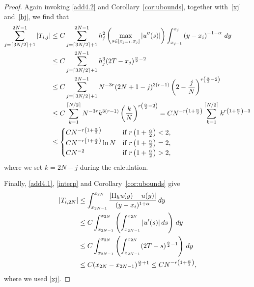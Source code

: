 \documentclass[smallextended]{svjour3}       %
\begin{document}
\begin{proof}
	Again  invoking \eqref{add4.2} and Corollary~\ref{cor:ubounds}, together with~\eqref{xj} and~\eqref{hj}, we find that
	\begin{align}
		\sum_{j=\lceil 3N/2\rceil +1}^{2N-1}  |T_{i,j}| &\le C \sum_{j=\lceil 3N/2\rceil +1}^{2N-1}   h_j^2
		\left(\max_{s\in[x_{j-1}, x_j]} \left| u''(s)\right| \right)
		\int_{x_{j-1}}^{x_j}  \left(y - x_{i}\right)^{-1-\alpha} \,dy \notag\\
		&\le C \sum_{j=\lceil 3N/2\rceil +1}^{2N-1}  h_j^3 (2T-x_j)^{\frac{\alpha}{2}-2} \notag\\
		&\le C \sum_{j=\lceil 3N/2\rceil +1}^{2N-1} N^{-3r}  (2N+1-j)^{3(r-1)}
		\left(2-\frac{j}{N}\right)^{r\left(\frac{\alpha}{2}-2\right)} \notag\\	
		&\le C \sum_{k=1}^{\lceil N/2\rceil} N^{-3r} k^{3(r-1)} \left(\frac{k}{N}\right)^{r\left(\frac{\alpha}{2}-2\right)} 		
		= C N^{-r\left(1+\frac{\alpha}{2}\right)}
		\sum_{k=1}^{\lceil N/2\rceil}  k^{r\left(1+\frac{\alpha}{2}\right)-3} \notag\\
		&\le \begin{cases}
			C N^{-r\left(1+\frac{\alpha}{2}\right)}  &\text{if } r\left(1+\frac{\alpha}{2}\right)<2, \\
			C N^{-r\left(1+\frac{\alpha}{2}\right)}\ln N  &\text{if } r\left(1+\frac{\alpha}{2}\right)=2, \\	
			C N^{-2}  &\text{if } r\left(1+\frac{\alpha}{2}\right)>2,
		\end{cases}    \label{Ti3N+2imp}
	\end{align}
	where we set $k=2N-j$ during the calculation.
	
	Finally, \eqref{add4.1}, \eqref{interp} and Corollary~\ref{cor:ubounds} give
	\begin{align}
		\left|T_{i,2N}\right| &\le \int_{x_{2N-1}}^{x_{2N}}\frac{|\Pi_hu(y)-u(y)|}{(y-x_i)^{1+\alpha}} \,dy  \notag\\
		&\le C \int_{x_{2N-1}}^{x_{2N}} \left(\int_{x_{2N-1}}^{x_{2N}} |u'(s)|\,ds\right) \,dy \notag\\
		&\le C\int_{x_{2N-1}}^{x_{2N}} \left(\int_{x_{2N-1}}^{x_{2N}}(2T-s)^{\frac{\alpha}{2}-1}\right)\,dy  \notag\\
		&\le C(x_{2N}-x_{2N-1})^{\frac{\alpha}{2}+1}  \le   CN^{-r\left(1+\frac{\alpha}{2}\right)},   \label{Ti2Nimp}
	\end{align}
	where we used \eqref{xj}.
	

\end{proof}
\end{document}
